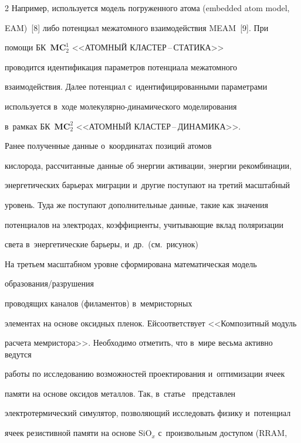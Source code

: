 \begin{multicols}{2}
Например, используется модель погруженного атома (embedded atom model, 


EAM)~[8] либо потенциал межатомного взаимодействия MEAM~[9]. При 


помощи БК~$\mathbf{MC}_2^1$ <<АТОМНЫЙ КЛАСТЕР\,--\,СТА\-ТИ\-КА>> 


проводится идентификация параметров потенциала межатомного 


взаимодействия. Далее потенциал с~идентифицированными параметрами 


используется в~ходе мо\-ле\-ку\-ляр\-но-ди\-на\-ми\-че\-ско\-го моделирования 


в~рамках БК~$\mathbf{MC}_2^2$ <<АТОМНЫЙ КЛАС\-ТЕР\,--\,ДИ\-НА\-МИ\-КА>>. 





Ранее полученные данные о~координатах позиций атомов 


кислорода, рассчитанные данные об энергии активации, энергии рекомбинации, 


энергетических барьерах миграции и~другие поступают на третий масштабный 


уровень. Туда же поступают дополнительные данные, такие как значения 


потенциалов на электродах, коэффициенты, учитывающие вклад поляризации 


света в~энергетические барьеры, и~др.\ (см.\ рисунок) 


    


На третьем масштабном уровне сформирована математическая модель 


обра\-зо\-ва\-ния/раз\-ру\-ше\-ния\linebreak


 проводящих каналов (филаментов) в~мемристорных 


элементах на основе оксидных пленок. Ей\linebreak соответствует <<Композитный модуль 


расчета мемристора>>. Необходимо отметить, что в~мире весьма активно ведутся 


работы по исследованию возможностей проектирования и~оптимизации ячеек 


памяти на основе оксидов металлов. Так, в~\mbox{статье}~\cite{10-ab} пред\-став\-лен 


электротермический симулятор, позволяющий исследовать физику и~потенциал 


ячеек резистивной памяти на основе SiO$_x$ с~произвольным доступом (RRAM,



\end{multicols}
